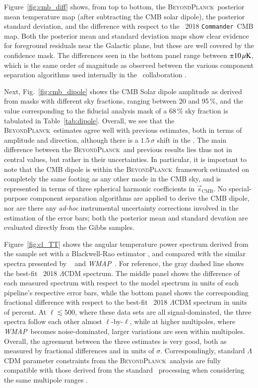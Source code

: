 \documentclass[onecolumn]{aa}
\def\WMAP{\emph{WMAP}}
\def\commander{\texttt{Commander}}
\newcommand{\s}[0]{\vec{s}}
\newcommand{\BP}{\textsc{BeyondPlanck}}
\begin{document}
Figure~\ref{fig:cmb_diff} shows, from top to bottom, the \BP\ posterior
mean temperature map (after subtracting the CMB solar dipole), the
posterior standard deviation, and the difference with respect to the
\Planck\ 2018 \commander\ CMB map. Both the posterior mean and
standard deviation maps show clear evidence for foreground residuals
near the Galactic plane, but these are well covered by the confidence
mask. The differences seen in the bottom panel range between
$\pm10\muK$, which is the same order of magnitude as observed between
the various component separation algorithms used internally in the
\Planck\ collaboration \citep{planck2016-l04}. 

Next, Fig.~\ref{fig:cmb_dipole} shows the CMB Solar dipole amplitude
as derived from masks with different sky fractions, ranging between 20
and 95\,\%, and the value corresponding to the fiducial analysis mask
of a 68\,\% sky fraction is tabulated in
Table~\ref{tab:dipole}. Overall, we see that the \BP\ estimates agree
well with previous estimates, both in terms of amplitude and
direction, although there is a $1.5\,\sigma$ shift in the . The main difference between the \BP\ and previous results
lies thus not in central values, but rather in their uncertainties. In
particular, it is important to note that the CMB dipole is within the
\BP\ framework estimated on completely the same footing as any other
mode in the CMB sky, and is represented in terms of three spherical
harmonic coefficients in $\s_{\mathrm{CMB}}$. No special-purpose
component separation algorithms are applied to derive the CMB dipole,
nor are there any \emph{ad-hoc} instrumental uncertainty corrections
involved in the estimation of the error bars; both the posterior mean
and standard devation are evaluated directly from the Gibbs
samples. 

Figure~\ref{fig:cl_TT} shows the angular temperature power spectrum
derived from the sample set with a Blackwell-Rao estimator
\citep{chu2005,bp11}, and compared with the similar spectra presented
by \Planck\ \citep{planck2016-l05} and \WMAP\ \citep{hinshaw2012}. For
reference, the gray dashed line shows the best-fit \Planck\ 2018
$\Lambda$CDM spectrum. The middle panel shows the difference of each
measured spectrum with respect to the model spectrum in units of each
pipeline's respective error bars, while the bottom panel shows the
corresponding fractional difference with respect to the best-fit
\Planck\ 2018 $\Lambda$CDM spectrum in units of percent. At
$\ell\lesssim 500$, where these data sets are all signal-dominated,
the three spectra follow each other almost $\ell$-by-$\ell$, while at
higher multipoles, where \WMAP\ becomes noise-dominated, larger
variations are seen within multipoles. Overall, the agreement between
the three estimates is very good, both as measured by fractional
differences and in units of $\sigma$. Correspondingly, standard
$\Lambda$CDM parameter constraints from the \BP\ analysis are fully
compatible with those derived from the standard \Planck\ processing
when considering the same multipole ranges \citep{bp12}. 
\end{document}
